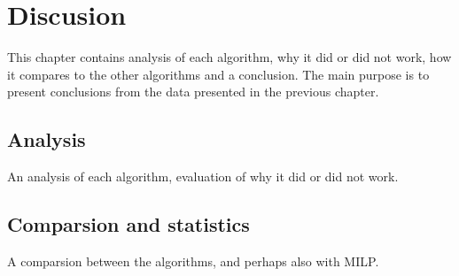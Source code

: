 \chapter{Discusion}
This chapter contains analysis of each algorithm, why it did or did
not work, how it compares to the other algorithms and a
conclusion. The main purpose is to present conclusions from the data presented
in the previous chapter. 
\section{Analysis}
An analysis of each algorithm,  evaluation of why it did or did not work. \par

\section{Comparsion and statistics}
A comparsion between the algorithms, and perhaps also with MILP. \par